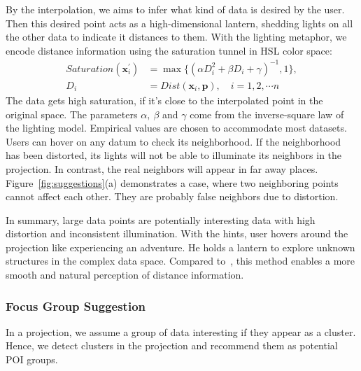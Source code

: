 {By the interpolation, we aims to infer what kind of data is desired by the user. Then this desired point acts as a high-dimensional lantern, shedding lights on all the other data to indicate it distances to them. With the lighting metaphor, we encode distance information using the saturation tunnel in HSL color space:
\begin{equation}
\begin{split}
Saturation(\mathbf{x}_{i}^{\prime}) &= \max{\{(\alpha D_{i}^{2} + \beta D_{i} + \gamma)^{-1}, 1\}},\\
D_{i} &= Dist(\mathbf{x}_{i}, \mathbf{p}), \quad i = 1,2,\cdots n
\end{split}
\end{equation}
The data gets high saturation, if it's close to the interpolated point in the original space. The parameters $\alpha,\ \beta$ and $\gamma$ come from the inverse-square law of the lighting model. Empirical values are chosen to accommodate most datasets. Users can hover on any datum to check its neighborhood. If the neighborhood has been distorted, its lights will not be able to illuminate its neighbors in the projection. In contrast, the real neighbors will appear in far away places. Figure~\ref{fig:suggestions}(a) demonstrates a case, where two neighboring points cannot affect each other. They are probably false neighbors due to distortion.

In summary, large data points are potentially interesting data with high distortion and inconsistent illumination. With the hints, user hovers around the projection like experiencing an adventure. He holds a lantern to explore unknown structures in the complex data space. Compared to~\cite{DBLP:journals/tvcg/StahnkeDMT16}, this method enables a more smooth and natural perception of distance information.
}

\subsubsection{Focus Group Suggestion}
\label{subsection:groupsuggestion}
In a projection, we assume a group of data interesting if they appear as a cluster. Hence, we detect clusters in the projection and recommend them as potential POI groups.

